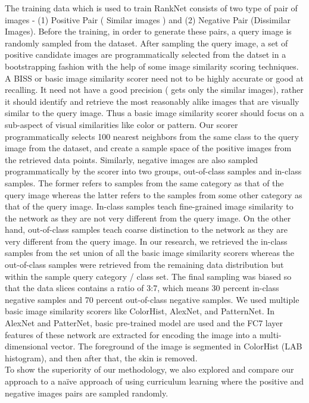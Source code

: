 \documentclass[10pt,twocolumn,letterpaper]{article}
\begin{document}
The training data which is used to train RankNet consists of two type of pair of images - (1) Positive Pair ( Similar images ) and (2) Negative Pair (Dissimilar Images). Before the training, in order to generate these pairs, a query image is randomly sampled from the dataset. After sampling the query image, a set of positive candidate images are programmatically selected from the datset in a bootstrapping fashion with the help of some image similarity scoring techniques. A BISS or basic image similarity scorer need not to be highly accurate or good at recalling. It need not have a good precision ( gets only the similar images), rather it should identify and retrieve the most reasonably alike images that are visually similar to the query image. Thus a basic image similarity scorer should focus on a sub-aspect of visual similarities like color or pattern. Our scorer programmatically selects 100 nearest neighbors from the same class to the query image from the dataset, and create a sample space of the positive images from the retrieved data points. Similarly, negative images are also sampled programmatically by the scorer into two groups, out-of-class samples and in-class samples. The former refers to samples from the same category as that of the query image whereas the latter refers to the samples from some other category as that of the query image. In-class samples teach fine-grained image similarity \cite{c21} to the network as they are not very different from the query image. On the other hand, out-of-class samples teach coarse distinction to the network as they are very different from the query image. In our research, we retrieved the in-class samples from the set union of all the basic image similarity scorers whereas the out-of-class samples were retrieved from the remaining data distribution but within the sample query category / class set. The final sampling was biased so that the data slices contains a ratio of 3:7, which means 30 percent in-class negative samples and 70 percent out-of-class negative samples. We used multiple basic image similarity scorers like ColorHist, AlexNet, and PatternNet. In AlexNet and PatterNet, basic pre-trained model are used  and the FC7 layer features of these network are extracted for encoding the image into a multi-dimensional vector. The foreground of the image is segmented in ColorHist (LAB histogram),  and then after that, the skin is removed.\\
To show the superiority of our methodology, we also explored and compare our approach to a naïve approach of using curriculum learning where the positive and negative images pairs are sampled randomly.
\end{document}
